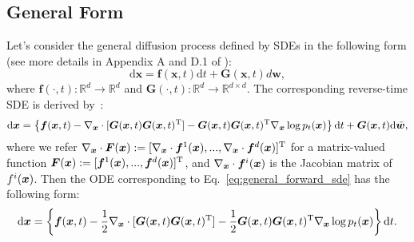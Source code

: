 \documentclass[11pt]{article}
\begin{document}
\subsection{General Form}
Let's consider the general diffusion process defined by SDEs in the following form (see more details in Appendix A and D.1 of \citet{DBLP:conf/iclr/0011SKKEP21}):
\begin{equation}
\label{eq:general_forward_sde}
    \text{d}\bm{x} = \bm f(\bm x,t)\text{d}t +\bm{G}(\bm x, t)d\bm w,
\end{equation}
where $\bm f(\cdot,t):\mathbb{R}^d\rightarrow\mathbb{R}^d$ and $\bm{G}(\cdot,t):\mathbb{R}^d\rightarrow\mathbb{R}^{d\times d}$. The corresponding reverse-time SDE is derived by~\citet{anderson1982reverse}:
\begin{equation}
\label{eq:general_reverse_sde}
    \text d\bm x=\left\{ \bm f(\bm x,t) - \nabla_{\bm x} \cdot[\bm{G}(\bm{x},t)\bm{G}(\bm{x},t)^{\text T}] - \bm{G}(\bm{x},t)\bm{G}(\bm{x},t)^{\text T}\nabla_{\bm x} \log p_t(\bm x) \right\}\text d t+\bm{G}(\bm{x},t)\text d\Bar{\bm w},
\end{equation}
where we refer $\nabla_{\bm x}\cdot \bm F(\bm x) := [\nabla_{\bm x}\cdot \bm f^1(\bm x),...,\nabla_{\bm x}\cdot \bm f^d(\bm x)]^{\text T}$ for a matrix-valued function $\bm F(\bm x):=[\bm f^1(\bm x),...,\bm f^d(\bm x)]^{\text T}$, and $\nabla_{\bm x}\cdot \bm f^i(\bm x)$ is the Jacobian matrix of $f^i(\bm x)$.
Then the ODE corresponding to Eq.~\ref{eq:general_forward_sde} has the following form:
\begin{equation}
\label{eq:general_ode}
    \text d\bm x=\left\{ \bm f(\bm x,t) - \frac{1}{2}\nabla_{\bm x}\cdot[\bm{G}(\bm{x},t)\bm{G}(\bm{x},t)^{\text T}] -\frac{1}{2}\bm{G}(\bm{x},t)\bm{G}(\bm{x},t)^{\text T}\nabla_{\bm x}\log p_t(\bm x) \right\}\text d t.
\end{equation}
\end{document}
